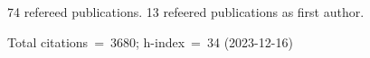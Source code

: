 74 refereed publications. 13 refeered publications as first author.

Total citations~=~3680; h-index~=~34 (2023-12-16)